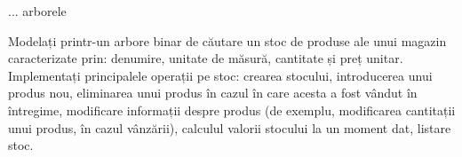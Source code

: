 \documentclass[11pt,a4paper]{report}
\begin{document}
\begin{problema}
  ... arborele
\end{problema}

\begin{problema}
  Modelați printr-un arbore binar de căutare un stoc de produse ale unui magazin caracterizate prin:
  denumire, unitate de măsură, cantitate și preț unitar.
  Implementați principalele operații pe stoc: crearea stocului, introducerea unui produs nou, eliminarea
  unui produs în cazul în care acesta a fost vândut în întregime, modificare informații despre produs
  (de exemplu, modificarea cantitații unui produs, în cazul vânzării), calculul valorii stocului la un
  moment dat, listare stoc.
\end{problema}
\end{document}
